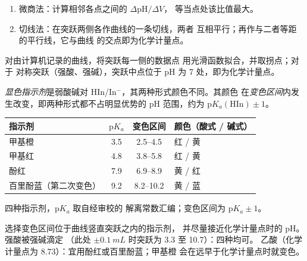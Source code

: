 \begin{method}[由曲线确定等当点]\label{met:b1:titration-methods:derivative}
\begin{enumerate}
  \item 微商法：计算相邻各点之间的 $\Delta\mathrm{pH}/\Delta V$，
        等当点处该比值最大。
  \item 切线法：在突跃两侧各作曲线的一条切线，两者
        互相平行；再作与二者等距的平行线，它与曲线
        的交点即为化学计量点。
\end{enumerate}
\end{method}

\begin{method}[切线法（计算）]\label{met:b1:titration-methods:tangents}
对由计算机记录的曲线，将突跃每一侧的数据点
用光滑函数拟合，并取拐点；对于
对称突跃（强酸、强碱），突跃中点位于
pH 为 7 处，即为化学计量点。
\end{method}

\begin{definition}\label{def:b1:titration-methods:indicator}
\emph{显色指示剂}是弱酸碱对
HIn/In$^-$，其两种形式颜色不同。其颜色
在\emph{变色区间}内发生改变，即两种形式都不占明显优势的
pH 范围，约为 $\mathrm{p}K_{a}(\mathrm{HIn}) \pm 1$。
\end{definition}

\begin{omfigure}
\begin{tabular}{lccl}
\hline
指示剂 & $\mathrm{p}K_a$ & 变色区间 & 颜色（酸式 / 碱式） \\
\hline
甲基橙 & 3.5 & 2.5--4.5 & 红 / 黄 \\
甲基红 & 4.8 & 3.8--5.8 & 红 / 黄 \\
酚红 & 7.9 & 6.9--8.9 & 黄 / 红 \\
百里酚蓝（第二次变色） & 9.2 & 8.2--10.2 & 黄 / 蓝 \\
\hline
\end{tabular}

\smallskip
{\small 四种指示剂，$\mathrm{p}K_a$ 取自经审校的
解离常数汇编；变色区间为 $\mathrm{p}K_a \pm 1$。}
\end{omfigure}

\begin{method}[选择指示剂]\label{met:b1:titration-methods:choose-indicator}
选择变色区间位于曲线竖直突跃之内的指示剂，
并尽量接近化学计量点时的 pH。强酸被强碱滴定
（此处 $\pm\qty{0.1}{mL}$ 时突跃为 3.3 至 10.7）：四种均可。
乙酸（化学计量点为 8.73）：宜用酚红或百里酚蓝；甲基橙
会在远早于化学计量点时就变色。
\end{method}

